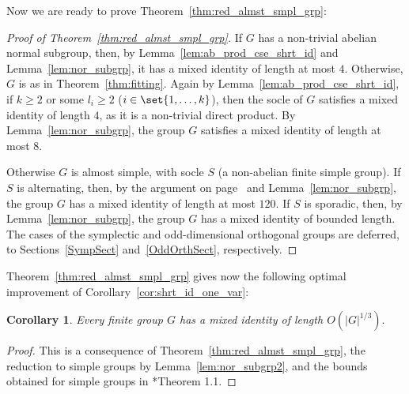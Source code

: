 \documentclass[a4paper,11pt]{amsproc}
\DeclareMathOperator{\Aut}{Aut}%
\DeclareMathOperator{\soc}{soc}%
\theoremstyle{plain}
\newtheorem{corollary}[lemma]{Corollary}
\theoremstyle{definition}
\newtheorem{remark}[lemma]{Remark}
\begin{document}
	
	Now we are ready to prove Theorem~\ref{thm:red_almst_smpl_grp}:
	
	\begin{proof}[Proof of Theorem~\ref{thm:red_almst_smpl_grp}]
		If $G$ has a non-trivial abelian normal subgroup, then, by Lemma~\ref{lem:ab_prod_cse_shrt_id} and Lemma~\ref{lem:nor_subgrp}, it has a mixed identity of length at most $4$. Otherwise, $G$ is as in Theorem~\ref{thm:fitting}. Again by Lemma~\ref{lem:ab_prod_cse_shrt_id}, if $k\geq2$ or some $l_i\geq 2$ ($i\in\set{1,\ldots,k}$), then the socle of $G$ satisfies a mixed identity of length $4$, as it is a non-trivial direct product. By Lemma~\ref{lem:nor_subgrp}, the group $G$ satisfies a mixed identity of length at most $8$. 
		
		Otherwise $G$ is almost simple, with socle $S$ (a non-abelian finite simple group). If $S$ is alternating, then, by the argument on page~\pageref{fct:bd_ids_alt_grps} and Lemma~\ref{lem:nor_subgrp}, the group $G$ has a mixed identity of length at most $120$. 
		If $S$ is sporadic, then, by Lemma~\ref{lem:nor_subgrp}, the group $G$ has a mixed identity of bounded length. The cases of the symplectic and odd-dimensional orthogonal 
		groups are deferred, to Sections~\ref{SympSect} and~\ref{OddOrthSect}, respectively. 
	\end{proof}
	
	Theorem~\ref{thm:red_almst_smpl_grp} gives now the following optimal improvement of Corollary~\ref{cor:shrt_id_one_var}:
	
	\begin{corollary} 
		Every finite group $G$ has a mixed identity of length $O(|G|^{1/3}).$
	\end{corollary}
	
	\begin{proof}
		This is a consequence of Theorem~\ref{thm:red_almst_smpl_grp}, the reduction to simple groups by Lemma~\ref{lem:nor_subgrp2}, and the bounds obtained for simple groups in \cite{bradford2019lie}*{Theorem 1.1}. 
	\end{proof}
	
\end{document}
